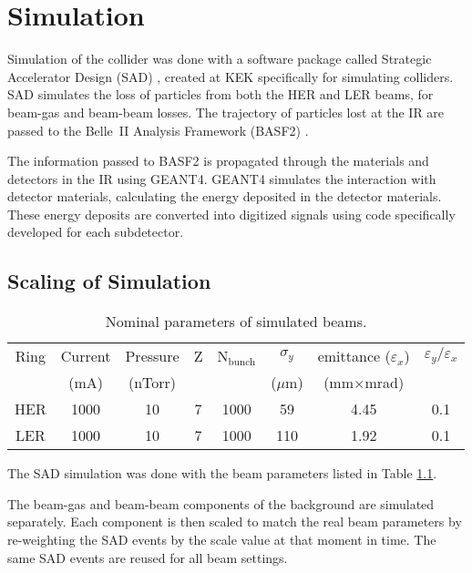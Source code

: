 \chapter{Simulation}
\label{chap:Sim}

	Simulation of the collider was done with a software package called Strategic Accelerator Design (SAD) \cite{SAD}, created at KEK specifically for simulating \epem colliders. SAD simulates the loss of particles from both the HER and LER beams, for beam-gas and beam-beam losses. The trajectory of particles lost at the IR are passed to the Belle~II Analysis Framework (BASF2) \cite{BASF2}. 

	The information passed to BASF2 is propagated through the materials and detectors in the IR using GEANT4. GEANT4 simulates the interaction with detector materials, calculating the energy deposited in the detector materials. These energy deposits are converted into digitized signals using code specifically developed for each subdetector.

\section{Scaling of Simulation}



\begin{table}[htb]
	\centering
	\begin{tabular}{ cccccccc }
	Ring	& Current & Pressure 	& Z & N$_{\mathrm{bunch}}$	& $\sigma_y$ 		& emittance ($\varepsilon_x$) 	& $\varepsilon_y/\varepsilon_x$ \\
		& (mA)	  & (nTorr)	&   & 				& ($\mu\mathrm{m}$)	& (mm$\times$mrad)	&  \\ \hline \hline
	HER	& 1000		& 10			& 7 & 1000		& 59		& 4.45		& 0.1	\\
	LER	& 1000		& 10			& 7 & 1000		& 110		& 1.92		& 0.1	\\	\hline
	\end{tabular}
	\caption[Nominal parameters of simulated beams]{Nominal parameters of simulated beams.}
	\label{tab:SimBeam}
\end{table}


The SAD simulation was done with the beam parameters listed in Table \ref{tab:SimBeam}. 


The beam-gas and beam-beam components of the background are simulated separately. Each component is then scaled to match the real beam parameters by re-weighting the SAD events by the scale value at that moment in time. The same SAD events are reused for all beam settings.

